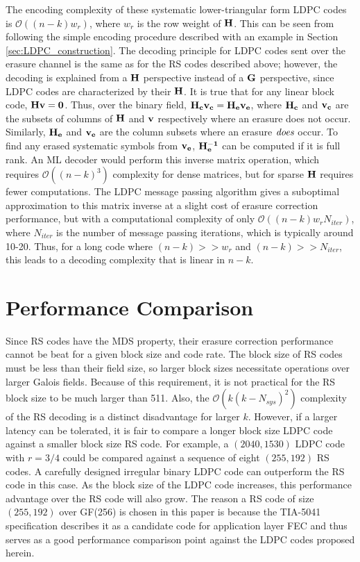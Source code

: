 \documentclass[conference]{IEEEtran}
\begin{document}
The encoding complexity of these systematic lower-triangular form LDPC codes is $\mathcal O((n-k)w_r)$, where $w_r$ is the row weight of $\bf{H}$.  This can be seen from following the simple encoding procedure described with an example in Section \ref{sec:LDPC_construction}.  The decoding principle for LDPC codes sent over the erasure channel is the same as for the RS codes described above; however, the decoding is explained from a $\bf{H}$ perspective instead of a $\bf{G}$ perspective, since LDPC codes are characterized by their $\bf{H}$.  It is true that for any linear block code, $\bf{H}\bf{v} = \bf{0}$.  Thus, over the binary field, $\bf{H}_c\bf{v}_c = \bf{H}_e\bf{v}_e$, where $\bf{H}_c$ and $\bf{v}_c$ are the subsets of columns of $\bf{H}$ and $\bf{v}$ respectively where an erasure does not occur.  Similarly, $\bf{H}_e$ and $\bf{v}_e$ are the column subsets where an erasure $\it{does}$ occur.  To find any erased systematic symbols from $\bf{v}_e$, $\bf{H}_e^{-1}$ can be computed if it is full rank.  An ML decoder would perform this inverse matrix operation, which requires $\mathcal O((n-k)^3)$ complexity for dense matrices, but for sparse $\bf{H}$ requires fewer computations.  The LDPC message passing algorithm gives a suboptimal approximation to this matrix inverse at a slight cost of erasure correction performance, but with a computational complexity of only $\mathcal O((n-k)w_rN_{iter})$, where $N_{iter}$ is the number of message passing iterations, which is typically around 10-20.  Thus, for a long code where $(n-k) >> w_r$ and $(n-k) >> N_{iter}$, this leads to a decoding complexity that is linear in $n-k$.

\section{Performance Comparison}\label{sec:Performance}
Since RS codes have the MDS property, their erasure correction performance cannot be beat for a given block size and code rate.  The block size of RS codes must be less than their field size, so larger block sizes necessitate operations over larger Galois fields.  Because of this requirement, it is not practical for the RS block size to be much larger than 511.  Also, the $\mathcal O(k(k-N_{sys})^2)$ complexity of the RS decoding is a distinct disadvantage for larger $k$.  However, if a larger latency can be tolerated, it is fair to compare a longer block size LDPC code against a smaller block size RS code.  For example, a $(2040, 1530)$ LDPC code with $r = {3}/{4}$ could be compared against a sequence of eight $(255, 192)$ RS codes.  A carefully designed irregular binary LDPC code can outperform the RS code in this case.  As the block size of the LDPC code increases, this performance advantage over the RS code will also grow.  The reason a RS code of size $(255, 192)$ over GF(256) is chosen in this paper is because the TIA-5041 specification \cite{TIA5041_standard} describes it as a candidate code for application layer FEC and thus serves as a good performance comparison point against the LDPC codes proposed herein.
\end{document}
